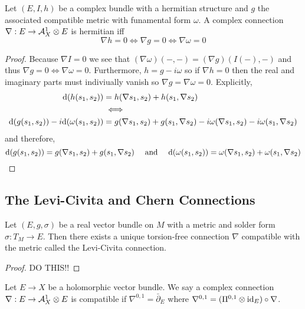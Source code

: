 \documentclass[12pt]{article}
\begin{document}
\begin{prop}
Let $(E, I, h)$ be a complex bundle with a hermitian structure and $g$ the associated compatible metric with funamental form $\omega$. A complex connection $\nabla : E \to \mathcal{A}^1_X \otimes E$ is hermitian iff
\[ \nabla h = 0 \iff \nabla g = 0 \iff \nabla \omega = 0 \]
\end{prop}

\begin{proof}
Because $\nabla I = 0$ we see that $(\nabla \omega)(-,-) = (\nabla g)(I(-),-)$ and thus $\nabla g = 0 \iff \nabla \omega = 0$. Furthermore, $h = g - i \omega$ so if $\nabla h = 0$ then the real and imaginary parts must indiviually vanish so $\nabla g = \nabla \omega = 0$. Explicitly,
\begin{align*}
\mathrm{d}{(h(s_1, s_2))} & = h(\nabla s_1, s_2) + h(s_1, \nabla s_2) 
\\
& \iff
\\
\mathrm{d}{(g(s_1, s_2))} - i \mathrm{d}{(\omega(s_1, s_2))} & = g(\nabla s_1, s_2) + g(s_1, \nabla s_2) - i \omega(\nabla s_1, s_2)  - i \omega(s_1, \nabla s_2)
\end{align*}
and therefore,
\[ \mathrm{d}{(g(s_1, s_2))} = g(\nabla s_1, s_2) + g(s_1, \nabla s_2)  \quad \text{ and } \quad \mathrm{d}{(\omega(s_1, s_2))} = \omega(\nabla s_1, s_2) + \omega(s_1, \nabla s_2) \]
\end{proof}


\subsection{The Levi-Civita and Chern Connections}

\renewcommand{\C}{\mathbb{C}}

\begin{prop}
Let $(E, g, \sigma)$ be a real vector bundle on $M$ with a metric and solder form $\sigma : T_M \to E$. Then there exists a unique torsion-free connection $\nabla$ compatible with the metric called the Levi-Civita connection.
\end{prop}

\begin{proof}
DO THIS!!
\end{proof}

\begin{defn}
Let $E \to X$ be a holomorphic vector bundle. We say a complex connection $\nabla : E \to \mathcal{A}^1_X \otimes E$ is compatible if $\nabla^{0,1} = \bar{\partial}_E$ where $\nabla^{0,1} = (\Pi^{0,1} \otimes \mathrm{id}_E) \circ \nabla$.
\end{defn}
\end{document}
